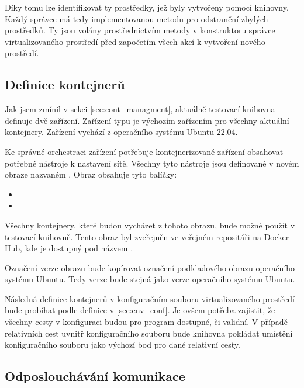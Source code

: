 Díky tomu lze identifikovat ty prostředky, jež byly vytvořeny pomocí knihovny. Každý správce má tedy implementovanou metodu pro odstranění zbylých prostředků. Ty jsou volány prostřednictvím metody  v konstruktoru správce virtualizovaného prostředí před započetím všech akcí k vytvoření nového prostředí.

\subsection{Definice kontejnerů}

Jak jsem zmínil v sekci \ref{sec:cont_managment}, aktuálně testovací knihovna definuje dvě zařízení. Zařízení typu  je výchozím zařízením pro všechny aktuální kontejnery. Zařízení vychází z operačního systému Ubuntu 22.04. 

Ke správné orchestraci zařízení potřebuje kontejnerizované zařízení obsahovat potřebné nástroje k nastavení sítě. Všechny tyto nástroje jsou definované v novém obraze nazvaném . Obraz obsahuje tyto balíčky:

\begin{itemize}
    \item {}
    \item {}
\end{itemize}

Všechny kontejnery, které budou vycházet z tohoto obrazu, bude možné použít v testovací knihovně. Tento obraz byl zveřejněn ve veřejném repositáři na Docker Hub\cite{docker_hub}, kde je dostupný pod názvem .

Označení verze obrazu bude kopírovat označení podkladového obrazu operačního systému Ubuntu. Tedy verze bude stejná jako verze operačního systému Ubuntu. 

Následná definice kontejnerů v konfiguračním souboru virtualizovaného prostředí bude probíhat podle definice v \ref{sec:env_conf}. Je ovšem potřeba zajistit, že všechny cesty v konfiguraci budou pro program dostupné, či validní. V případě relativních cest uvnitř konfiguračního souboru bude knihovna pokládat umístění konfiguračního souboru jako výchozí bod pro dané relativní cesty.

\subsection{Odposlouchávání komunikace}

